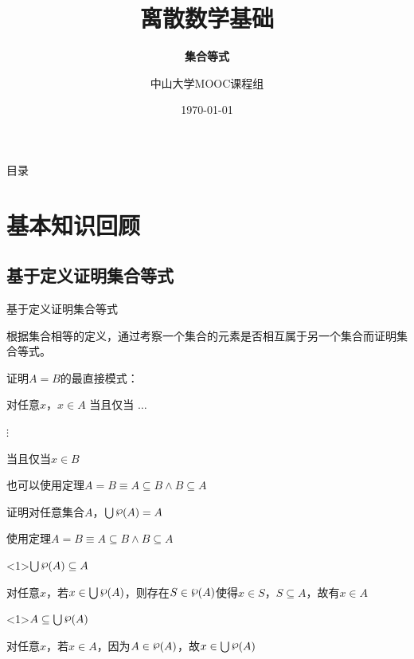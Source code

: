 \documentclass[xetex,10pt,aspectratio=43]{beamer}
\title{离散数学基础}
\subtitle{\fontsize{9pt}{14pt}\textbf{集合等式}}
\author{中山大学MOOC课程组}
\institute{\fontsize{8pt}{14pt}中山大学计算机学院}
\date{\today}
\newcommand{\powerset}{\raisebox{.15\baselineskip}{\ensuremath{\wp}}}
\begin{document}
	
	\frame{\titlepage}
	
	\section[目录]{}   %
	\begin{frame}{目录}
		\tableofcontents
	\end{frame}

	\section{基本知识回顾}
	
	\subsection{基于定义证明集合等式}
	
	\begin{frame}{基于定义证明集合等式}
		
		根据集合相等的定义，通过考察一个集合的元素是否相互属于另一个集合而证明集合等式。
		
		\vspace{0.5cm}
		
		证明$A=B$的最直接模式：
		
		对任意$x$，$x\in A$ 当且仅当 $\dots$
		
		\qquad\qquad\qquad\qquad\qquad$\vdots$
		
		\qquad\qquad\qquad\qquad 当且仅当$x\in B$	
		
		\vspace{0.5cm}
		
		也可以使用定理$A=B\equiv A\subseteq B\wedge B\subseteq A$
		
	\end{frame}


	\begin{frame}{证明对任意集合$A$，$\bigcup \powerset(A)=A$}
	
	使用定理$A=B\equiv A\subseteq B\wedge B\subseteq A$
	
	\begin{block}{$\bigcup \powerset(A)\subseteq A$}
		
		对任意$x$，若$x\in \bigcup\powerset(A)$，则存在$S\in \powerset(A)$使得$x\in S$，$S\subseteq A$，故有$x\in A$
		
	\end{block}
	
	\begin{block}{$A\subseteq\bigcup \powerset(A)$}
		
		对任意$x$，若$x\in A$，因为$A\in \powerset(A)$，故$x\in \bigcup\powerset(A)$
		
	\end{block}
	
	\end{frame}
\end{document}
